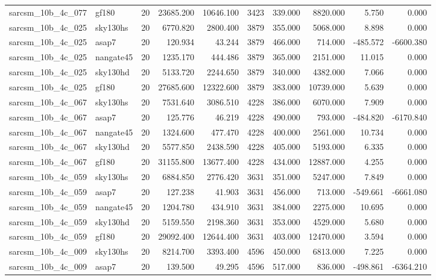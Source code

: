 \begin{tabular}{llrrrrrrrr}
sarcsm\_10b\_4c\_077 & gf180 & 20 & 23685.200 & 10646.100 & 3423 & 339.000 & 8820.000 & 5.750 & 0.000 \\
sarcsm\_10b\_4c\_025 & sky130hs & 20 & 6770.820 & 2800.400 & 3879 & 355.000 & 5068.000 & 8.898 & 0.000 \\
sarcsm\_10b\_4c\_025 & asap7 & 20 & 120.934 & 43.244 & 3879 & 466.000 & 714.000 & -485.572 & -6600.380 \\
sarcsm\_10b\_4c\_025 & nangate45 & 20 & 1235.170 & 444.486 & 3879 & 365.000 & 2151.000 & 11.015 & 0.000 \\
sarcsm\_10b\_4c\_025 & sky130hd & 20 & 5133.720 & 2244.650 & 3879 & 340.000 & 4382.000 & 7.066 & 0.000 \\
sarcsm\_10b\_4c\_025 & gf180 & 20 & 27685.600 & 12322.600 & 3879 & 383.000 & 10739.000 & 5.639 & 0.000 \\
sarcsm\_10b\_4c\_067 & sky130hs & 20 & 7531.640 & 3086.510 & 4228 & 386.000 & 6070.000 & 7.909 & 0.000 \\
sarcsm\_10b\_4c\_067 & asap7 & 20 & 125.776 & 46.219 & 4228 & 490.000 & 793.000 & -484.820 & -6170.840 \\
sarcsm\_10b\_4c\_067 & nangate45 & 20 & 1324.600 & 477.470 & 4228 & 400.000 & 2561.000 & 10.734 & 0.000 \\
sarcsm\_10b\_4c\_067 & sky130hd & 20 & 5577.850 & 2438.590 & 4228 & 405.000 & 5193.000 & 6.335 & 0.000 \\
sarcsm\_10b\_4c\_067 & gf180 & 20 & 31155.800 & 13677.400 & 4228 & 434.000 & 12887.000 & 4.255 & 0.000 \\
sarcsm\_10b\_4c\_059 & sky130hs & 20 & 6884.850 & 2776.420 & 3631 & 351.000 & 5247.000 & 7.849 & 0.000 \\
sarcsm\_10b\_4c\_059 & asap7 & 20 & 127.238 & 41.903 & 3631 & 456.000 & 713.000 & -549.661 & -6661.080 \\
sarcsm\_10b\_4c\_059 & nangate45 & 20 & 1204.780 & 434.910 & 3631 & 384.000 & 2275.000 & 10.695 & 0.000 \\
sarcsm\_10b\_4c\_059 & sky130hd & 20 & 5159.550 & 2198.360 & 3631 & 353.000 & 4529.000 & 5.680 & 0.000 \\
sarcsm\_10b\_4c\_059 & gf180 & 20 & 29092.400 & 12644.400 & 3631 & 403.000 & 12470.000 & 3.594 & 0.000 \\
sarcsm\_10b\_4c\_009 & sky130hs & 20 & 8214.700 & 3393.400 & 4596 & 450.000 & 6813.000 & 7.225 & 0.000 \\
sarcsm\_10b\_4c\_009 & asap7 & 20 & 139.500 & 49.295 & 4596 & 517.000 & 836.000 & -498.861 & -6364.210 \\

\end{tabular}
